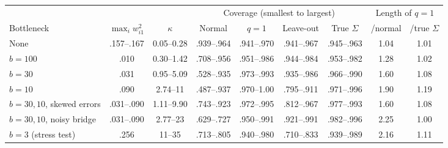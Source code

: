 \begin{tabular}{@{}l c c c c c c c c@{}}
\toprule
 & & & \multicolumn{4}{c}{Coverage (smallest to largest)} & \multicolumn{2}{c}{Length of $q=1$} \\ \cmidrule(lr){4-7}\cmidrule(l){8-9}
Bottleneck & $\max_iw_{i1}^2$ & $\kappa$ & Normal & $q=1$ & Leave-out & True $\Sigma$ & /normal & /true $\Sigma$ \\
\midrule
None & .157--.167 & 0.05--0.28 & .939--.964 & .941--.970 & .941--.967 & .945--.963 & 1.04 & 1.01 \\
$b=100$ & .010 & 0.30--1.42 & .708--.956 & .951--.986 & .944--.984 & .953--.982 & 1.28 & 1.02 \\
$b=30$ & .031 & 0.95--5.09 & .528--.935 & .973--.993 & .935--.986 & .966--.990 & 1.60 & 1.08 \\
$b=10$ & .090 & 2.74--11 & .487--.937 & .970--1.00 & .795--.911 & .971--.996 & 1.90 & 1.19 \\
\addlinespace
$b=30,10$, skewed errors & .031--.090 & 1.11--9.90 & .743--.923 & .972--.995 & .812--.967 & .977--.993 & 1.60 & 1.08 \\
$b=30,10$, noisy bridge & .031--.090 & 2.77--23 & .629--.727 & .950--.991 & .921--.991 & .982--.996 & 2.25 & 1.00 \\
$b=3$ (stress test) & .256 & 11--35 & .713--.805 & .940--.980 & .710--.833 & .939--.989 & 2.16 & 1.11 \\
\bottomrule
\end{tabular}
